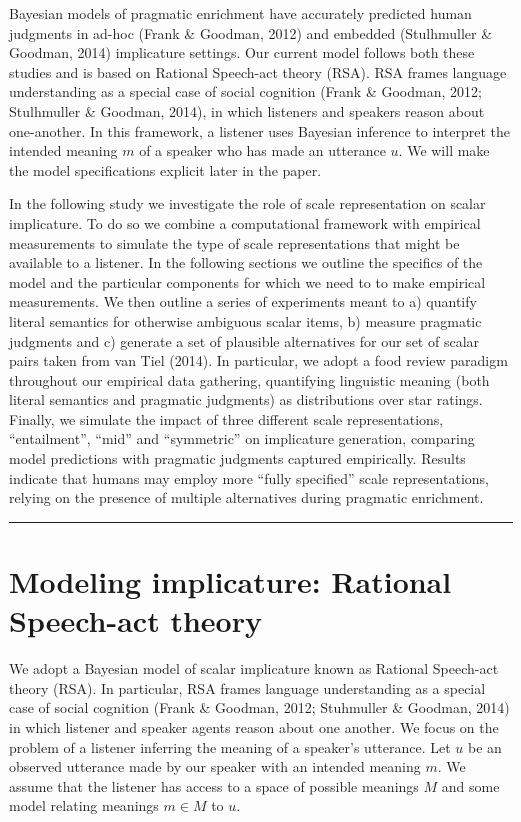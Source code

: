 \documentclass[10pt, letterpaper]{article}
\begin{document}
Bayesian models of pragmatic enrichment have accurately predicted human
judgments in ad-hoc (Frank \& Goodman, 2012) and embedded (Stulhmuller
\& Goodman, 2014) implicature settings. Our current model follows both
these studies and is based on Rational Speech-act theory (RSA). RSA
frames language understanding as a special case of social cognition
(Frank \& Goodman, 2012; Stulhmuller \& Goodman, 2014), in which
listeners and speakers reason about one-another. In this framework, a
listener uses Bayesian inference to interpret the intended meaning \(m\)
of a speaker who has made an utterance \(u\). We will make the model
specifications explicit later in the paper.

In the following study we investigate the role of scale representation
on scalar implicature. To do so we combine a computational framework
with empirical measurements to simulate the type of scale
representations that might be available to a listener. In the following
sections we outline the specifics of the model and the particular
components for which we need to to make empirical measurements. We then
outline a series of experiments meant to a) quantify literal semantics
for otherwise ambiguous scalar items, b) measure pragmatic judgments and
c) generate a set of plausible alternatives for our set of scalar pairs
taken from van Tiel (2014). In particular, we adopt a food review
paradigm throughout our empirical data gathering, quantifying linguistic
meaning (both literal semantics and pragmatic judgments) as
distributions over star ratings. Finally, we simulate the impact of
three different scale representations, ``entailment'', ``mid'' and
``symmetric'' on implicature generation, comparing model predictions
with pragmatic judgments captured empirically. Results indicate that
humans may employ more ``fully specified'' scale representations,
relying on the presence of multiple alternatives during pragmatic
enrichment.

\begin{center}\rule{0.5\linewidth}{\linethickness}\end{center}

\section{Modeling implicature: Rational Speech-act
theory}\label{modeling-implicature-rational-speech-act-theory}

We adopt a Bayesian model of scalar implicature known as Rational
Speech-act theory (RSA). In particular, RSA frames language
understanding as a special case of social cognition (Frank \& Goodman,
2012; Stuhmuller \& Goodman, 2014) in which listener and speaker agents
reason about one another. We focus on the problem of a listener
inferring the meaning of a speaker's utterance. Let \(u\) be an observed
utterance made by our speaker with an intended meaning \(m\). We assume
that the listener has access to a space of possible meanings \(M\) and
some model relating meanings \(m \in M\) to \(u\).
\end{document}
